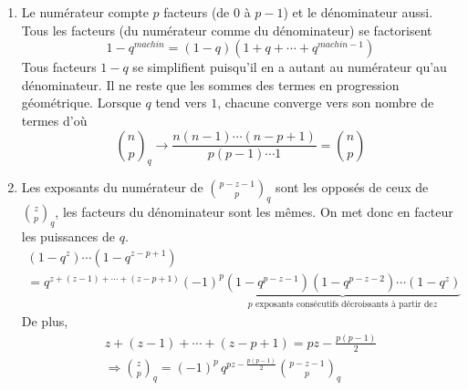 \begin{enumerate}
\begin{enumerate}
  \item Le numérateur compte $p$ facteurs (de $0$ à $p-1$) et le dénominateur aussi. Tous les facteurs (du numérateur comme du dénominateur) se factorisent
\begin{displaymath}
  1-q^{machin} = (1-q)(1+q+\cdots+q^{machin -1})
\end{displaymath}
Tous facteurs $1-q$ se simplifient puisqu'il en a autant au numérateur qu'au dénominateur. Il ne reste que les sommes des termes en progression géométrique. Lorsque $q$ tend vers $1$, chacune converge vers son nombre de termes d'où
\begin{displaymath}
{\binom{n}{p}}_q \rightarrow \frac{n(n-1)\cdots(n-p+1)}{p(p-1)\cdots 1} = \binom{n}{p}
\end{displaymath}

  \item Les exposants du numérateur de ${\binom{p-z-1}{p}}_q$ sont les opposés de ceux de ${\binom{z}{p}}_q$, les facteurs du dénominateur sont les mêmes. On met donc en facteur les puissances de $q$.
\begin{multline*}
(1-q^z)\cdots(1-q^{z-p+1})\\
= q^{z+(z-1)+\cdots+(z-p+1)}(-1)^{p}
\underset{p \text{ exposants consécutifs décroissants à partir de} z}{\underbrace{(1-q^{p-z-1})(1-q^{p-z-2})\cdots(1-q^{z})}}
\end{multline*}
De plus,
\begin{multline*}
z+(z-1)+\cdots+(z-p+1) = pz-\frac{p(p-1)}{2} \\
\Rightarrow
{\binom{z}{p}}_q = (-1)^p\,q^{pz-\frac{p(p-1)}{2}}{\binom{p-z-1}{p}}_q
\end{multline*}

\end{enumerate}

\end{enumerate}
